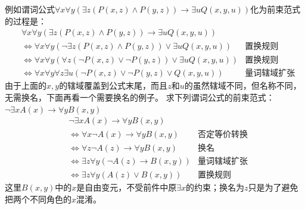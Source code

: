 例如谓词公式$\forall x\forall y(\exists z(P(x,z)\land P(y,z))\to\exists uQ(x,y,u))$化为前束范式的过程是：
\begin{align*}
&\forall x\forall y(\exists z(P(x,z)\land P(y,z))\to\exists uQ(x,y,u))\\
&\Leftrightarrow \forall x\forall y(\neg\exists z(P(x,z)\land P(y,z))\lor\exists uQ(x,y,u))&\text{置换规则}\\
&\Leftrightarrow \forall x\forall y(\forall z(\neg P(x,z)\lor\neg P(y,z))\lor\exists uQ(x,y,u))&\text{置换规则}\\
&\Leftrightarrow \forall x\forall y\forall z\exists u(\neg P(x,z)\lor\neg P(y,z)\lor Q(x,y,u))&\text{量词辖域扩张}
\end{align*}
由于上面的$x,y$的辖域覆盖到公式末尾，而且$z$和$u$的虽然辖域不同，但名称不同，无需换名，下面再看一个需要换名的例子。
求下列谓词公式的前束范式：$\neg\exists xA(x)\to\forall yB(x,y)$
\begin{align*}
    &\neg\exists xA(x)\to\forall yB(x,y)\\
    &\Leftrightarrow \forall x\neg A(x)\to\forall yB(x,y)&\text{否定等价转换}\\
    &\Leftrightarrow \forall z\neg A(z)\to\forall yB(x,y)&\text{换名}\\
    &\Leftrightarrow \exists z\forall y(\neg A(z)\to B(x,y))&\text{量词辖域扩张}\\
    &\Leftrightarrow \exists z\forall y(A(z)\lor B(x,y))&\text{置换规则}
\end{align*}
这里$B(x,y)$中的$x$是自由变元，不受前件中原$\exists x$的约束；换名为$z$只是为了避免把两个不同角色的$x$混淆。

